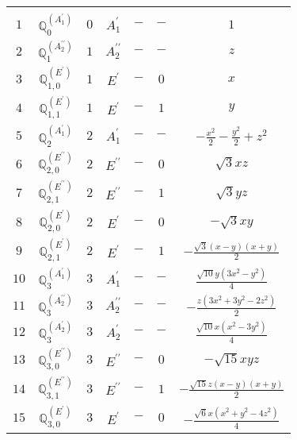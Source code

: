 \documentclass[fleqn,10pt,landscape]{article}
\begin{document}
\begin{itemize}
\begin{center}
\begin{longtable}{ccccccc}
 \hline \hline
\multicolumn{6}{r}{} \\ \endlastfoot

$ 1 $ & $ \mathbb{Q}_{0}^{(A_{1}^{\prime})} $ & $ 0 $ & $ A_{1}^{\prime} $ & $ - $ & $ - $ & $ 1 $ \\ \hline
$ 2 $ & $ \mathbb{Q}_{1}^{(A_{2}^{\prime\prime})} $ & $ 1 $ & $ A_{2}^{\prime\prime} $ & $ - $ & $ - $ & $ z $ \\
$ 3 $ & $ \mathbb{Q}_{1,0}^{(E^{\prime})} $ & $ 1 $ & $ E^{\prime} $ & $ - $ & $ 0 $ & $ x $ \\
$ 4 $ & $ \mathbb{Q}_{1,1}^{(E^{\prime})} $ & $ 1 $ & $ E^{\prime} $ & $ - $ & $ 1 $ & $ y $ \\ \hline
$ 5 $ & $ \mathbb{Q}_{2}^{(A_{1}^{\prime})} $ & $ 2 $ & $ A_{1}^{\prime} $ & $ - $ & $ - $ & $ - \frac{x^{2}}{2} - \frac{y^{2}}{2} + z^{2} $ \\
$ 6 $ & $ \mathbb{Q}_{2,0}^{(E^{\prime\prime})} $ & $ 2 $ & $ E^{\prime\prime} $ & $ - $ & $ 0 $ & $ \sqrt{3} x z $ \\
$ 7 $ & $ \mathbb{Q}_{2,1}^{(E^{\prime\prime})} $ & $ 2 $ & $ E^{\prime\prime} $ & $ - $ & $ 1 $ & $ \sqrt{3} y z $ \\
$ 8 $ & $ \mathbb{Q}_{2,0}^{(E^{\prime})} $ & $ 2 $ & $ E^{\prime} $ & $ - $ & $ 0 $ & $ - \sqrt{3} x y $ \\
$ 9 $ & $ \mathbb{Q}_{2,1}^{(E^{\prime})} $ & $ 2 $ & $ E^{\prime} $ & $ - $ & $ 1 $ & $ - \frac{\sqrt{3} \left(x - y\right) \left(x + y\right)}{2} $ \\ \hline
$ 10 $ & $ \mathbb{Q}_{3}^{(A_{1}^{\prime})} $ & $ 3 $ & $ A_{1}^{\prime} $ & $ - $ & $ - $ & $ \frac{\sqrt{10} y \left(3 x^{2} - y^{2}\right)}{4} $ \\
$ 11 $ & $ \mathbb{Q}_{3}^{(A_{2}^{\prime\prime})} $ & $ 3 $ & $ A_{2}^{\prime\prime} $ & $ - $ & $ - $ & $ - \frac{z \left(3 x^{2} + 3 y^{2} - 2 z^{2}\right)}{2} $ \\
$ 12 $ & $ \mathbb{Q}_{3}^{(A_{2}^{\prime})} $ & $ 3 $ & $ A_{2}^{\prime} $ & $ - $ & $ - $ & $ \frac{\sqrt{10} x \left(x^{2} - 3 y^{2}\right)}{4} $ \\
$ 13 $ & $ \mathbb{Q}_{3,0}^{(E^{\prime\prime})} $ & $ 3 $ & $ E^{\prime\prime} $ & $ - $ & $ 0 $ & $ - \sqrt{15} x y z $ \\
$ 14 $ & $ \mathbb{Q}_{3,1}^{(E^{\prime\prime})} $ & $ 3 $ & $ E^{\prime\prime} $ & $ - $ & $ 1 $ & $ - \frac{\sqrt{15} z \left(x - y\right) \left(x + y\right)}{2} $ \\
$ 15 $ & $ \mathbb{Q}_{3,0}^{(E^{\prime})} $ & $ 3 $ & $ E^{\prime} $ & $ - $ & $ 0 $ & $ - \frac{\sqrt{6} x \left(x^{2} + y^{2} - 4 z^{2}\right)}{4} $ \\

\end{longtable}
\end{center}
\end{itemize}
\end{document}
